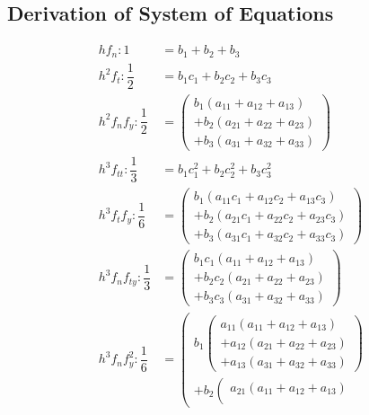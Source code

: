 \documentclass[a4paper,oneside]{book}
\numberwithin{equation}{chapter}
\begin{document}
\subsection{Derivation of System of Equations}
\begin{align}
h{f_n}:1 &= {b_1} + {b_2} + {b_3}\\
{h^2}{f_t}:\dfrac{1}{2} &= {b_1}{c_1} + {b_2}{c_2} + {b_3}{c_3}\\
{h^2}{f_n}{f_y}:\dfrac{1}{2} &= \left( \begin{array}{l}
{b_1}\left( {{a_{11}} + {a_{12}} + {a_{13}}} \right)\\
 + {b_2}\left( {{a_{21}} + {a_{22}} + {a_{23}}} \right)\\
 + {b_3}\left( {{a_{31}} + {a_{32}} + {a_{33}}} \right)
\end{array} \right)\\
{h^3}{f_{tt}}:\dfrac{1}{3} &= {b_1}c_1^2 + {b_2}c_2^2 + {b_3}c_3^2\\
{h^3}{f_t}{f_y}:\dfrac{1}{6} &= \left( \begin{array}{l}
{b_1}\left( {{a_{11}}{c_1} + {a_{12}}{c_2} + {a_{13}}{c_3}} \right)\\
 + {b_2}\left( {{a_{21}}{c_1} + {a_{22}}{c_2} + {a_{23}}{c_3}} \right)\\
 + {b_3}\left( {{a_{31}}{c_1} + {a_{32}}{c_2} + {a_{33}}{c_3}} \right)
\end{array} \right)\\
{h^3}{f_n}{f_{ty}}:\dfrac{1}{3} &= \left( \begin{array}{l}
{b_1}{c_1}\left( {{a_{11}} + {a_{12}} + {a_{13}}} \right)\\
 + {b_2}{c_2}\left( {{a_{21}} + {a_{22}} + {a_{23}}} \right)\\
 + {b_3}{c_3}\left( {{a_{31}} + {a_{32}} + {a_{33}}} \right)
\end{array} \right)\\
{h^3}{f_n}f_y^2:\dfrac{1}{6} &= \left( \begin{array}{l}
{b_1}\left( \begin{array}{l}
{a_{11}}\left( {{a_{11}} + {a_{12}} + {a_{13}}} \right)\\
 + {a_{12}}\left( {{a_{21}} + {a_{22}} + {a_{23}}} \right)\\
 + {a_{13}}\left( {{a_{31}} + {a_{32}} + {a_{33}}} \right)
\end{array} \right)\\
 + {b_2}\left( \begin{array}{l}
{a_{21}}\left( {{a_{11}} + {a_{12}} + {a_{13}}} \right)\\

\end{array}
\end{array}
\end{align}
\end{document}
